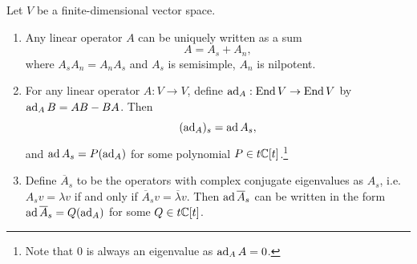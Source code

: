 \begin{theorem}\label{thm:decomposition}
  Let $V$ be a finite-dimensional
  vector space.
  \begin{enumerate}
    \item Any linear operator
      $A$ can be uniquely written as a sum
      \[
        A = A_s + A_n,
      \]
      where $A_s A_n = A_n A_s$ and
      $A_s$ is semisimple, $A_n$ is
      nilpotent.
    \item For any linear operator
      $A : V \to V$, define
      $\operatorname{ad}_A : \operatorname{End} V \to \operatorname{End} V$ by
      $\operatorname{ad}_A B = AB - BA$. Then
      \[
        (\operatorname{ad}_A)_s = \operatorname{ad} A_s,
      \]
      and $\operatorname{ad} A_s = P(\operatorname{ad}_A)$ for
      some polynomial
      $P \in t \mathbb{C}[t]$.\footnote{Note that $0$ is always an eigenvalue as $\operatorname{ad}_A A = 0$.}
    \item Define $\overline{A}_s$ to be the
      operators with complex conjugate
      eigenvalues as $A_s$, i.e.
      $A_s v = \lambda v$ if and only if
      $\overline{A}_s v = \overline{\lambda} v$.
      Then $\operatorname{ad} \overline{A}_s$
      can be written in the form
      $\operatorname{ad} \overline{A}_s = Q(\operatorname{ad}_A)$
      for some $Q \in t \mathbb{C}[t]$.
  \end{enumerate}
\end{theorem}

